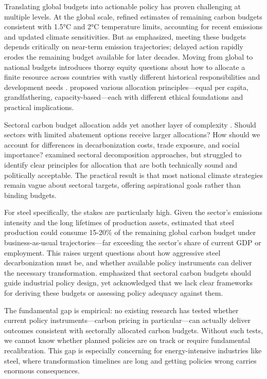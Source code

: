\documentclass[preprint,1p,authoryear]{elsarticle}
\begin{document}
Translating global budgets into actionable policy has proven challenging at multiple levels. At the global scale, \citet{rogelj2019new} refined estimates of remaining carbon budgets consistent with 1.5°C and 2°C temperature limits, accounting for recent emissions and updated climate sensitivities. But as \citet{millar2017emission} emphasized, meeting these budgets depends critically on near-term emission trajectories; delayed action rapidly erodes the remaining budget available for later decades. Moving from global to national budgets introduces thorny equity questions about how to allocate a finite resource across countries with vastly different historical responsibilities and development needs \citep{raupach2014sharing}. \citet{robiou2019national} proposed various allocation principles—equal per capita, grandfathering, capacity-based—each with different ethical foundations and practical implications.

Sectoral carbon budget allocation adds yet another layer of complexity \citep{gasser2018negative}. Should sectors with limited abatement options receive larger allocations? How should we account for differences in decarbonization costs, trade exposure, and social importance? \citet{kuramochi2018beyond} examined sectoral decomposition approaches, but struggled to identify clear principles for allocation that are both technically sound and politically acceptable. The practical result is that most national climate strategies remain vague about sectoral targets, offering aspirational goals rather than binding budgets.

For steel specifically, the stakes are particularly high. Given the sector's emissions intensity and the long lifetimes of production assets, \citet{bataille2018role} estimated that steel production could consume 15-20\% of the remaining global carbon budget under business-as-usual trajectories—far exceeding the sector's share of current GDP or employment. This raises urgent questions about how aggressive steel decarbonization must be, and whether available policy instruments can deliver the necessary transformation. \citet{Griffin2020} emphasized that sectoral carbon budgets should guide industrial policy design, yet acknowledged that we lack clear frameworks for deriving these budgets or assessing policy adequacy against them.

The fundamental gap is empirical: no existing research has tested whether current policy instruments—carbon pricing in particular—can actually deliver outcomes consistent with sectorally allocated carbon budgets. Without such tests, we cannot know whether planned policies are on track or require fundamental recalibration. This gap is especially concerning for energy-intensive industries like steel, where transformation timelines are long and getting policies wrong carries enormous consequences.
\end{document}

